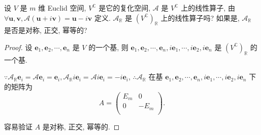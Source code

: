 \documentclass{ctexart}
\begin{document}
\begin{exercise}[4.4]
    设 $V$ 是 $m$ 维 Euclid 空间, $V^\mathbb{C}$ 是它的复化空间, $\mathcal{A}$ 是 $V^\mathbb{C}$ 上的线性算子, 由 $\forall\boldsymbol{u},\boldsymbol{v},\mathcal{A}(\boldsymbol{u}+i\boldsymbol{v})=\boldsymbol{u}-i\boldsymbol{v}$ 定义. $\mathcal{A}_\mathbb{R}$ 是 $(V^\mathbb{C})_\mathbb{R}$ 上的线性算子吗? 如果是, $\mathcal{A}_\mathbb{R}$ 是否是对称, 正交, 幂等的?
\end{exercise}
\begin{proof}
    设 $\boldsymbol{e}_1,\boldsymbol{e}_2,\cdots,\boldsymbol{e}_n$ 是 $V$ 的一个基, 则 $\boldsymbol{e}_1,\boldsymbol{e}_2,\cdots,\boldsymbol{e}_n,i\boldsymbol{e}_1,\cdots,i\boldsymbol{e}_2,i\boldsymbol{e}_n$ 是 $(V^\mathbb{C})_\mathbb{R}$ 的一个基.

    $\because\mathcal{A}_\mathbb{R}\boldsymbol{e}_i=\mathcal{A}\boldsymbol{e}_i=\boldsymbol{e}_i,\mathcal{A}_\mathbb{R}i\boldsymbol{e}_i=\mathcal{A}i\boldsymbol{e}_i=-i\boldsymbol{e}_i$, $\therefore\mathcal{A}_\mathbb{R}$ 在基 $\boldsymbol{e}_1,\boldsymbol{e}_2,\cdots,\boldsymbol{e}_n,i\boldsymbol{e}_1,\cdots,i\boldsymbol{e}_2,i\boldsymbol{e}_n$ 下的矩阵为
    \[A=\begin{pmatrix}
        E_m & 0 \\
        0 & -E_m \\
    \end{pmatrix}.\]

    容易验证 $A$ 是对称, 正交, 幂等的.
\end{proof}
\end{document}
